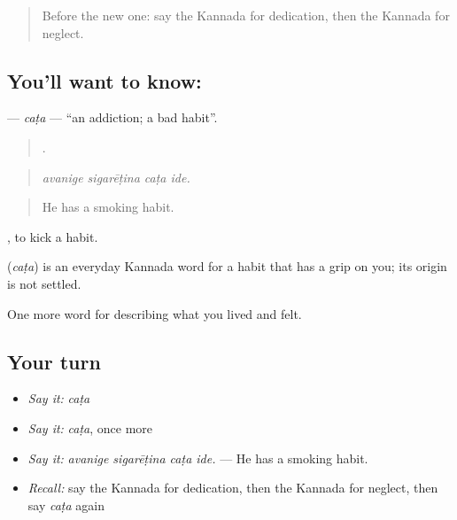 \label{lesson:KA-C505-cata}



\begin{quote}
Before the new one: say the Kannada for dedication, then the Kannada for neglect.
\end{quote}

\subsection*{You'll want to know: }
\textbf{} — \emph{caṭa} — \textquotedblleft{}an addiction; a bad habit\textquotedblright{}.

\begin{quote}
   .
\end{quote}

\begin{quote}
\emph{avanige sigarēṭina caṭa ide.}
\end{quote}

\begin{quote}
He has a smoking habit.
\end{quote}

 , to kick a habit.

\begin{cousinweb}
\textbf{} (\emph{caṭa}) is an everyday Kannada word for a habit that has a grip on you; its origin is not settled.
\end{cousinweb}

\begin{grammarlens}[title={What you've built}]
One more word for describing what you lived and felt.
\end{grammarlens}

\subsection*{Your turn}
\begin{itemize}
\raggedright
  \item \emph{Say it:} \emph{caṭa}
  \item \emph{Say it:} \emph{caṭa}, once more
  \item \emph{Say it:} \emph{avanige sigarēṭina caṭa ide.} — He has a smoking habit.
  \item \emph{Recall:} say the Kannada for dedication, then the Kannada for neglect, then say \emph{caṭa} again
\end{itemize}

